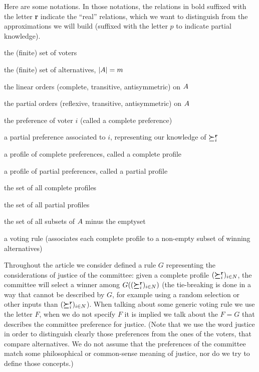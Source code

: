 \documentclass[version=last, pagesize, twoside=off, bibliography=totoc, DIV=calc, fontsize=14pt, a4paper, french, english]{scrartcl}
\begin{document}
Here are some notations. In those notations, the relations in bold suffixed with the letter \textbf{r} indicate the “real” relations, which we want to distinguish from the approximations we will build (suffixed with the letter $p$ to indicate partial knowledge).
\begin{description}[font=\normalfont, leftmargin=!, labelwidth=\widthof{$F: \allprofs \rightarrow \powersetz{\alts}$}]
	\item[$N$] the (finite) set of voters
	\item[$\alts$] the (finite) set of alternatives, $\lvert{A}\rvert = m$
	\item[$\linors \subseteq \powerset{\alts × \alts}$] the linear orders (complete, transitive, antisymmetric) on $\alts$
	\item[$\pors \subseteq \powerset{\alts × \alts}$] the partial orders (reflexive, transitive, antisymmetric) on $\alts$
	\item[$\pref_i \in \linors$] the preference of voter $i$ (called a complete preference)
	\item[$\ppref_i \in \pors$] a partial preference associated to $i$, representing our knowledge of $\boldsymbol{\succeq}^\textbf{r}_i$
	\item[$\prof = \profshort$] a profile of complete preferences, called a complete profile
	\item[$\pprof = \pprofshort$] a profile of partial preferences, called a partial profile
	\item[$\allprofs$] the set of all complete profiles
	\item[$\allpprofs$] the set of all partial profiles
	\item[$\powersetz{\alts}$] the set of all subsets of $\alts$ minus the emptyset
	\item[$F: \allprofs \rightarrow \powersetz{\alts}$] a voting rule (associates each complete profile to a non-empty subset of winning alternatives)
\end{description}

Throughout the article we consider defined a rule $G$ representing the considerations of justice of the committee: given a complete profile $(\boldsymbol{\succeq}^\textbf{r}_i)_{i \in N}$, the committee will select a winner among $G((\boldsymbol{\succeq}^\textbf{r}_i)_{i \in N})$ (the tie-breaking is done in a way that cannot be described by $G$, for example using a random selection or other inputs than $(\boldsymbol{\succeq}^\textbf{r}_i)_{i \in N}$). When talking about some generic voting rule we use the letter $F$, when we do not specify $F$ it is implied we talk about the $F=G$ that describes the committee preference for justice. (Note that we use the word justice in order to distinguish clearly those preferences from the ones of the voters, that compare alternatives. We do not assume that the preferences of the committee match some philosophical or common-sense meaning of justice, nor do we try to define those concepts.)
\end{document}
